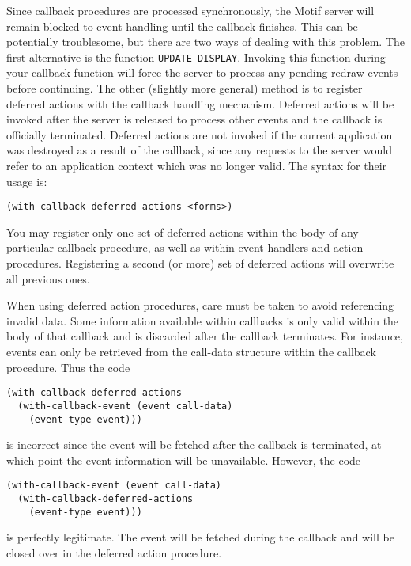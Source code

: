 \documentclass[a4paper]{article}
\begin{document}
Since callback procedures are processed synchronously, the Motif
server will remain blocked to event handling until the callback
finishes.  This can be potentially troublesome, but there are two ways
of dealing with this problem.  The first alternative is the function
\texttt{UPDATE-DISPLAY}.  Invoking this function during your callback
function will force the server to process any pending redraw events
before continuing.  The other (slightly more general) method is to
register deferred actions with the callback handling mechanism.
Deferred actions will be invoked after the server is released to
process other events and the callback is officially terminated.
Deferred actions are not invoked if the current application was
destroyed as a result of the callback, since any requests to the
server would refer to an application context which was no longer
valid.  The syntax for their usage is:

\begin{verbatim}
(with-callback-deferred-actions <forms>)
\end{verbatim}

You may register only one set of deferred actions within the body of
any particular callback procedure, as well as within event handlers
and action procedures.  Registering a second (or more) set of deferred
actions will overwrite all previous ones.

When using deferred action procedures, care must be taken to avoid
referencing invalid data.  Some information available within callbacks
is only valid within the body of that callback and is discarded after
the callback terminates.  For instance, events can only be retrieved
from the call-data structure within the callback procedure.  Thus the
code

\begin{verbatim}
(with-callback-deferred-actions
  (with-callback-event (event call-data)
    (event-type event)))
\end{verbatim}

is incorrect since the event will be fetched after the callback is
terminated, at which point the event information will be unavailable.
However, the code

\begin{verbatim}
(with-callback-event (event call-data)
  (with-callback-deferred-actions
    (event-type event)))
\end{verbatim}

is perfectly legitimate.  The event will be fetched during the callback and
will be closed over in the deferred action procedure.
\end{document}
